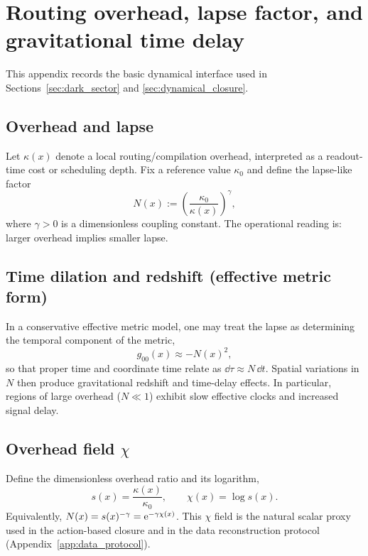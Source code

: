
\section{Routing overhead, lapse factor, and gravitational time delay}
\label{app:overhead_lapse}

This appendix records the basic dynamical interface used in Sections~\ref{sec:dark_sector} and \ref{sec:dynamical_closure}.

\subsection{Overhead and lapse}
Let $\kappa(x)$ denote a local routing/compilation overhead, interpreted as a readout-time cost or scheduling depth.
Fix a reference value $\kappa_0$ and define the lapse-like factor
\[
N(x):=\left(\frac{\kappa_0}{\kappa(x)}\right)^{\gamma},
\]
\noindent where $\gamma>0$ is a dimensionless coupling constant.
The operational reading is: larger overhead implies smaller lapse.

\subsection{Time dilation and redshift (effective metric form)}
In a conservative effective metric model, one may treat the lapse as determining the temporal component of the metric,
\[
g_{00}(x)\approx -N(x)^2,
\]
so that proper time and coordinate time relate as $\dd\tau \approx N\,\dd t$.
Spatial variations in $N$ then produce gravitational redshift and time-delay effects.
In particular, regions of large overhead ($N\ll 1$) exhibit slow effective clocks and increased signal delay.

\subsection{Overhead field \texorpdfstring{$\chi$}{chi}}
Define the dimensionless overhead ratio and its logarithm,
\[
s(x)=\frac{\kappa(x)}{\kappa_0},
\qquad
\chi(x)=\log s(x).
\]
Equivalently, $N(x)=s(x)^{-\gamma}=\mathrm{e}^{-\gamma\chi(x)}$.
This $\chi$ field is the natural scalar proxy used in the action-based closure and in the data reconstruction protocol (Appendix~\ref{app:data_protocol}).



